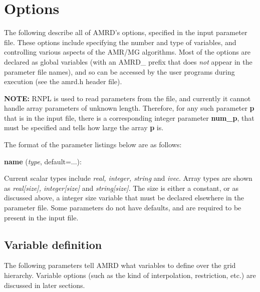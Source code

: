 \documentclass[aps,amssymb,unsortedaddress,nofootinbib]{revtex4}
\def\lsep{\itemsep 0.05in}
\begin{document}
\section{Options}\label{sec_opts}

The following describe all of AMRD's options, specified in the input
parameter file. These options include specifying the number and type
of variables, and controlling various aspects of the AMR/MG algorithms.
Most of the options are declared as global variables (with an AMRD\_
prefix that does {\em not} appear in the parameter file names), and
so can be accessed by the user programs during execution (see the 
amrd.h header file). 

{\bf NOTE:} RNPL is used to read parameters from the file, and
currently it cannot handle array parameters of unknown length. Therefore,
for any such parameter {\bf p} that is in the input file, there is a corresponding
integer parameter {\bf num\_p}, that must be specified and tells how
large the array {\bf p} is.

The format of the parameter listings below are as follows:

\begin{list}{}{\lsep}
\item {\bf name} ({\em type}, default=...):
\end{list}

Current scalar types include {\em real, integer, string} and {\em ivec}.
Array types are shown as {\em real[size], integer[size]} and {\em string[size]}.
The size is either a constant, or as discussed above, a integer size variable
that must be declared elsewhere in the parameter file.
Some parameters do not have defaults,
and are required to be present in the input file.

\subsection{Variable definition}

The following parameters tell AMRD what variables to define over the 
grid hierarchy. Variable options (such as the kind of interpolation, restriction, etc.)
are discussed in later sections.
\end{document}
